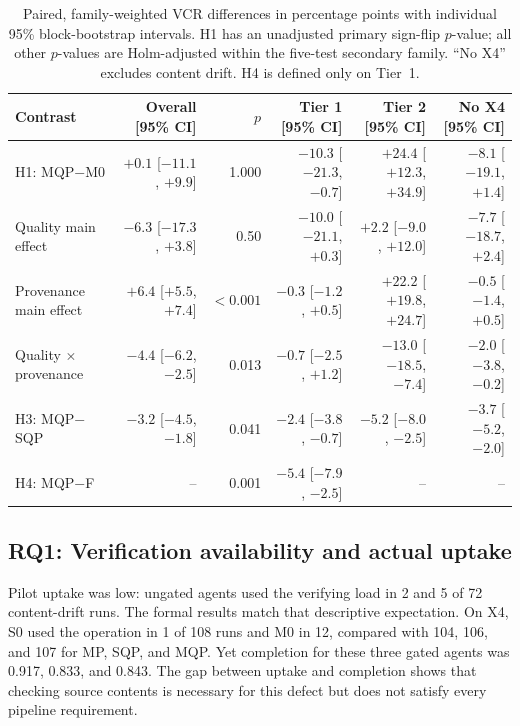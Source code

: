 \documentclass[conference]{IEEEtran}
\newcommand{\sys}[1]{\textsf{#1}}
\begin{document}
\begin{table}[t]
\caption{Paired, family-weighted VCR differences in percentage points with individual 95\% block-bootstrap intervals. H1 has an unadjusted primary sign-flip $p$-value; all other $p$-values are Holm-adjusted within the five-test secondary family. ``No X4'' excludes content drift. H4 is defined only on Tier~1.}
\label{tab:contrasts}
\centering\footnotesize\setlength{\tabcolsep}{3pt}
\begin{tabular}{@{}lrrrrr@{}}
\toprule
Contrast & Overall [95\% CI] & $p$ & Tier 1 [95\% CI] & Tier 2 [95\% CI] & No X4 [95\% CI] \\
\midrule
H1: \sys{MQP}$-$\sys{M0} & $+0.1$ [$-11.1$, $+9.9$] & 1.000 & $-10.3$ [$-21.3$, $-0.7$] & $+24.4$ [$+12.3$, $+34.9$] & $-8.1$ [$-19.1$, $+1.4$] \\
Quality main effect & $-6.3$ [$-17.3$, $+3.8$] & 0.50 & $-10.0$ [$-21.1$, $+0.3$] & $+2.2$ [$-9.0$, $+12.0$] & $-7.7$ [$-18.7$, $+2.4$] \\
Provenance main effect & $+6.4$ [$+5.5$, $+7.4$] & $<0.001$ & $-0.3$ [$-1.2$, $+0.5$] & $+22.2$ [$+19.8$, $+24.7$] & $-0.5$ [$-1.4$, $+0.5$] \\
Quality $\times$ provenance & $-4.4$ [$-6.2$, $-2.5$] & 0.013 & $-0.7$ [$-2.5$, $+1.2$] & $-13.0$ [$-18.5$, $-7.4$] & $-2.0$ [$-3.8$, $-0.2$] \\
H3: \sys{MQP}$-$\sys{SQP} & $-3.2$ [$-4.5$, $-1.8$] & 0.041 & $-2.4$ [$-3.8$, $-0.7$] & $-5.2$ [$-8.0$, $-2.5$] & $-3.7$ [$-5.2$, $-2.0$] \\
H4: \sys{MQP}$-$\sys{F} & -- & 0.001 & $-5.4$ [$-7.9$, $-2.5$] & -- & -- \\
\bottomrule
\end{tabular}
\end{table}

\subsection{RQ1: Verification availability and actual uptake}
Pilot uptake was low: ungated agents used the verifying load in 2 and 5 of 72 content-drift runs. The formal results match that descriptive expectation. On X4, \sys{S0} used the operation in 1 of 108 runs and \sys{M0} in 12, compared with 104, 106, and 107 for \sys{MP}, \sys{SQP}, and \sys{MQP}. Yet completion for these three gated agents was 0.917, 0.833, and 0.843. The gap between uptake and completion shows that checking source contents is necessary for this defect but does not satisfy every pipeline requirement.
\end{document}

